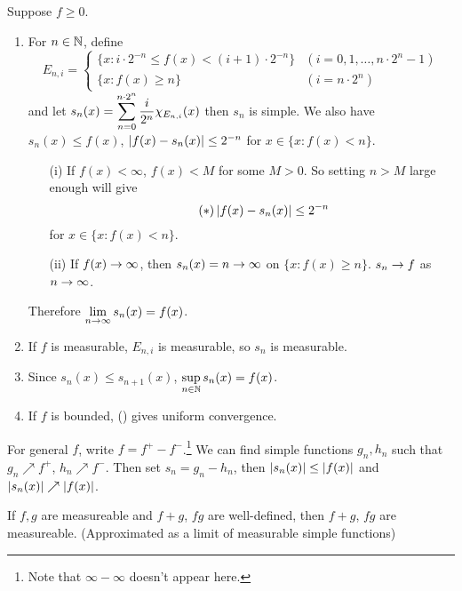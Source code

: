 \pf Suppose \(f \geq 0\).
\begin{enumerate}
    \item For \(n \in \mathbb{N}\), define
          \[
              E_{n, i} = \begin{cases}
                  \{x : i\cdot 2^{-n} \leq f(x) < (i+1)\cdot 2^{-n}\} & (i = 0, 1, \dots, n\cdot 2^n - 1) \\
                  \{x : f(x) \geq n\}                                 & (i = n\cdot 2^n)
              \end{cases}
          \]
          and let \(\displaystyle s_n(x) = \sum_{n=0}^{n\cdot 2^n} \frac{i}{2^n} \chi_{E_{n, i}} (x)\) then \(s_n\) is simple. We also have \(s_n(x) \leq f(x)\), \(\left| f(x) - s_n(x) \right| \leq 2^{-n}\) for \(x \in \{x : f(x) < n\}\).
          \begin{enumerate}
              \item[(i)] If \(f(x) < \infty\), \(f(x)< M\) for some \(M > 0\). So setting \(n > M\) large enough will give
                  \[ \tag{\mast}
                      \abs{f(x) - s_n(x)} \leq 2^{-n}
                  \]
                  for \(x \in \{x : f(x) < n\}\).
              \item[(ii)] If \(f(x) \rightarrow\infty\), then \(s_n(x) = n \rightarrow \infty\) on \(\{x : f(x) \geq n\}\). \(s_n \rightarrow f\) as \(n \rightarrow \infty\).
          \end{enumerate}
          Therefore \(\displaystyle \lim_{n \rightarrow \infty} s_n(x) = f(x)\).

    \item If \(f\) is measurable, \(E_{n, i}\) is measurable, so \(s_n\) is measurable.

    \item Since \(s_n(x) \leq s_{n+1}(x)\), \(\displaystyle \sup_{n\in \mathbb{N}} s_n(x) = f(x)\).

    \item If \(f\) is bounded, (\mast) gives uniform convergence.
\end{enumerate}

For general \(f\), write \(f = f^+ - f^-\).\footnote{Note that \(\infty - \infty\) doesn't appear here.} We can find simple functions \(g_n, h_n\) such that \(g_n \nearrow f^+\), \(h_n \nearrow f^-\). Then set \(s_n = g_n - h_n\), then \(\left| s_n(x) \right| \leq \left| f(x) \right|\) and \(\left| s_n(x) \right| \nearrow \left| f(x) \right|\).

\cor If \(f, g\) are measureable and \(f + g\), \(fg\) are well-defined, then \(f+g\), \(fg\) are measureable. (Approximated as a limit of measurable simple functions)

\pagebreak

